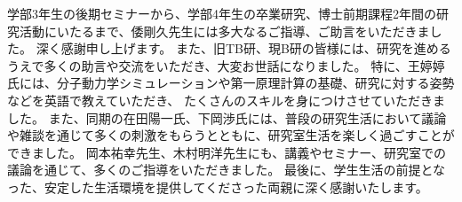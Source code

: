 学部3年生の後期セミナーから、学部4年生の卒業研究、博士前期課程2年間の研究活動にいたるまで、倭剛久先生には多大なるご指導、ご助言をいただきました。
深く感謝申し上げます。
また、旧TB研、現B研の皆様には、研究を進めるうえで多くの助言や交流をいただき、大変お世話になりました。
特に、王婷婷氏には、分子動力学シミュレーションや第一原理計算の基礎、研究に対する姿勢などを英語で教えていただき、
たくさんのスキルを身につけさせていただきました。
また、同期の在田陽一氏、下岡渉氏には、普段の研究生活において議論や雑談を通じて多くの刺激をもらうとともに、研究室生活を楽しく過ごすことができました。
岡本祐幸先生、木村明洋先生にも、講義やセミナー、研究室での議論を通じて、多くのご指導をいただきました。
最後に、学生生活の前提となった、安定した生活環境を提供してくださった両親に深く感謝いたします。
